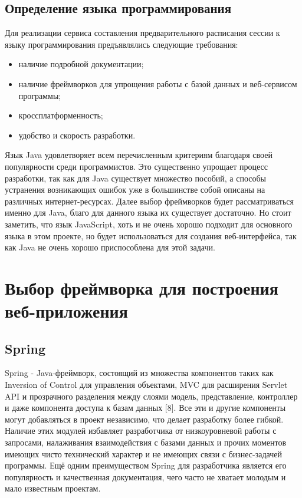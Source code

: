 \subsection{Определение языка программирования}
Для реализации сервиса составления предварительного расписания сессии к языку программирования предъявлялись следующие требования:
\begin{itemize}
	\item наличие подробной документации;
	\item наличие фреймворков для упрощения работы с базой данных и веб-сервисом программы;
	\item кроссплатформенность;
	\item удобство и скорость разработки.
\end{itemize}


Язык Java удовлетворяет всем перечисленным критериям благодаря своей популярности среди программистов. Это существенно упрощает процесс разработки, так как для Java существует множество пособий, а способы устранения возникающих ошибок уже в большинстве собой описаны на различных интернет-ресурсах. Далее выбор фреймворков будет рассматриваться именно для Java, благо для данного языка их существует достаточно. Но стоит заметить, что язык JavaScript, хоть и не очень хорошо подходит для основного языка в этом проекте, но будет использоваться для создания веб-интерфейса, так как Java не очень хорошо приспособлена для этой задачи.

\section{Выбор фреймворка для построения веб-приложения} \label{ch3:sec2}
\subsection{Spring}
Spring - Java-фреймворк, состоящий из множества компонентов таких как Inversion of Control для управления объектами, MVC для расширения Servlet API и прозрачного разделения между слоями модель, представление, контроллер и даже компонента доступа к базам данных [8]. Все эти и другие компоненты могут добавляться в проект независимо, что делает разработку более гибкой. Наличие этих модулей избавляет разработчика от низкоуровневой работы с запросами, налаживания взаимодействия с базами данных и прочих моментов имеющих чисто технический характер и не имеющих связи с бизнес-задачей программы. Ещё одним преимуществом Spring  для разработчика является его популярность и качественная документация, чего часто не хватает молодым и мало известным проектам.

